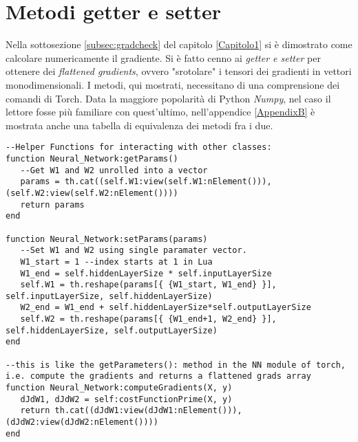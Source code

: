\section{Metodi getter e setter}
Nella sottosezione \ref{subsec:gradcheck} del capitolo \ref{Capitolo1} si è dimostrato come calcolare numericamente il gradiente. Si è fatto cenno ai \emph{getter e setter} per ottenere dei \emph{flattened gradients}, ovvero "srotolare" i tensori dei gradienti in vettori monodimensionali. I metodi, qui mostrati, necessitano di una comprensione dei comandi di Torch. Data la maggiore popolarità di Python \emph{Numpy}, nel caso il lettore fosse più familiare con quest'ultimo, nell'appendice \ref{AppendixB} è mostrata anche una tabella di equivalenza dei metodi fra i due. 
\begin{lstlisting}[language={[5.2]Lua}]
--Helper Functions for interacting with other classes:
function Neural_Network:getParams()
   --Get W1 and W2 unrolled into a vector
   params = th.cat((self.W1:view(self.W1:nElement())), (self.W2:view(self.W2:nElement())))
   return params
end

function Neural_Network:setParams(params)
   --Set W1 and W2 using single paramater vector.
   W1_start = 1 --index starts at 1 in Lua
   W1_end = self.hiddenLayerSize * self.inputLayerSize
   self.W1 = th.reshape(params[{ {W1_start, W1_end} }], self.inputLayerSize, self.hiddenLayerSize)
   W2_end = W1_end + self.hiddenLayerSize*self.outputLayerSize
   self.W2 = th.reshape(params[{ {W1_end+1, W2_end} }], self.hiddenLayerSize, self.outputLayerSize)
end

--this is like the getParameters(): method in the NN module of torch, i.e. compute the gradients and returns a flattened grads array
function Neural_Network:computeGradients(X, y)
   dJdW1, dJdW2 = self:costFunctionPrime(X, y)
   return th.cat((dJdW1:view(dJdW1:nElement())), (dJdW2:view(dJdW2:nElement())))
end
\end{lstlisting}
